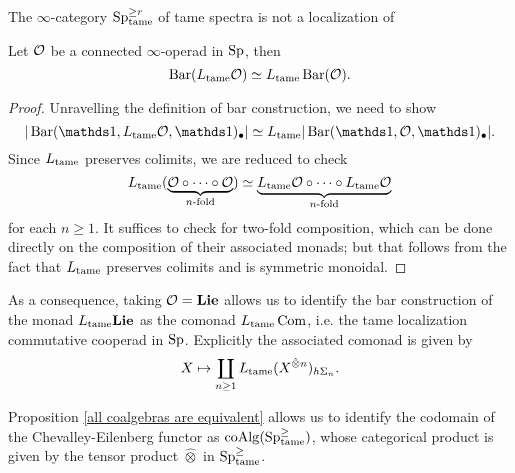 The $\infty$-category $\operatorname{Sp}^{\geq r}_{\operatorname{\operatorname{tame}}}$ of tame spectra is not a localization of 
\begin{lemma}
    Let ${\mathcal{O}}$ be a connected $\infty$-operad in $ \operatorname{Sp}$, then 
    $$
    \operatorname{Bar}(L_{\operatorname{\operatorname{tame}}}{\mathcal{O}} ) \simeq L_{\operatorname{\operatorname{tame}}} \operatorname{Bar}({\mathcal{O}}).
    $$
\end{lemma}
\begin{proof}
    Unravelling the definition of bar construction, we need to show 
    $$
     |\Barconstruction(\triv, L_{\tame}\CO , \triv)_{\bullet}|
     \simeq
     L_{\tame}|\Barconstruction(\triv, \CO , \triv)_{\bullet}|.
    $$
    Since $L_{\operatorname{\operatorname{tame}}}$ preserves colimits, we are reduced to check
    $$
    L_{\operatorname{\operatorname{tame}}} (\underbrace{{\mathcal{O}} \circ \cdots \circ {\mathcal{O}}}_{\text{$n$-fold}} )
    \simeq 
    \underbrace{ L_{\operatorname{\operatorname{tame}}}{\mathcal{O}} \circ \cdots \circ  L_{\operatorname{\operatorname{tame}}}{\mathcal{O}}}_{\text{$n$-fold}} 
    $$
    for each $n\geq 1$.
    It suffices to check for two-fold composition, which can be done directly on the composition of their associated monads; but that follows from the fact that $L_{\operatorname{\operatorname{tame}}}$ preserves colimits and is symmetric monoidal.
\end{proof}

As a consequence, taking ${\mathcal{O}}=\mathbf{Lie}$ allows us to identify the bar construction of the monad $L_{\operatorname{\operatorname{tame}}}\mathbf{Lie}$ as the comonad $L_{\operatorname{\operatorname{tame}}}\operatorname{Com}$, i.e. the tame localization commutative cooperad in $\operatorname{Sp}$. Explicitly the associated comonad is given by
$$
X \mapsto \coprod_{n\geq 1} L_{\operatorname{\operatorname{tame}}} (X^{\hat{\otimes} n})_{h\Sigma_n}.
$$










\clearpage






\begin{remark}
Proposition \ref{all coalgebras are equivalent} allows us to identify the codomain of the Chevalley-Eilenberg functor as $\operatorname{coAlg}(\operatorname{Sp}^{\geq}_{\operatorname{\operatorname{tame}}})$, whose categorical product is given by the tensor product $\hat{\otimes}$ in $\operatorname{Sp}^{\geq}_{\operatorname{\operatorname{tame}}}$.
\end{remark}

